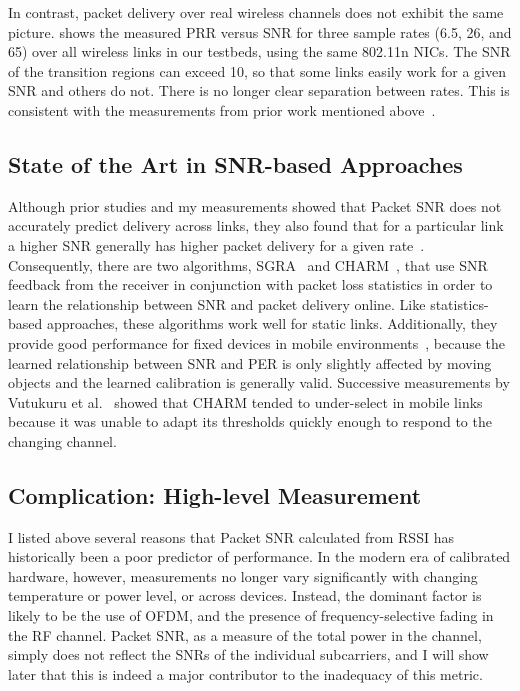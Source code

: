 In contrast, packet delivery over real wireless channels does not exhibit the same picture.  shows the measured PRR versus SNR for three sample rates (6.5\Mbps, 26\Mbps, and 65\Mbps) over all wireless links in our testbeds, using the same 802.11n NICs. The SNR of the transition regions can exceed 10\dB, so that some links easily work for a given SNR and others do not. There is no longer clear separation between rates. This is consistent with the measurements from prior work mentioned above~\cite{Aguayo_Roofnet, Judd_CHARM, Reis_interference, Zhang_SNRguided, Zhao_sensys03}.

\subsection{State of the Art in SNR-based Approaches}
Although prior studies and my measurements showed that Packet SNR does not accurately predict delivery across links, they also found that for a particular link a higher SNR generally has higher packet delivery for a given rate~\cite{Aguayo_Roofnet,Judd_CHARM,Zhang_SNRguided}. Consequently, there are two algorithms, SGRA~\cite{Zhang_SNRguided} and CHARM~\cite{Judd_CHARM}, that use SNR feedback from the receiver in conjunction with packet loss statistics in order to learn the relationship between SNR and packet delivery online. Like statistics-based approaches, these algorithms work well for static links. Additionally, they provide good performance for fixed devices in mobile environments~\cite{Judd_CHARM}, because the learned relationship between SNR and PER is only slightly affected by moving objects and the learned calibration is generally valid. Successive measurements by Vutukuru et al.~\cite{Vutukuru_SoftRate} showed that CHARM tended to under-select in mobile links because it was unable to adapt its thresholds quickly enough to respond to the changing channel.

\subsection{Complication: High-level Measurement}
I listed above several reasons that Packet SNR calculated from RSSI has historically been a poor predictor of performance. In the modern era of calibrated hardware, however, measurements no longer vary significantly with changing temperature or power level, or across devices. Instead, the dominant factor is likely to be the use of OFDM, and the presence of frequency-selective fading in the RF channel. Packet SNR, as a measure of the total power in the channel, simply does not reflect the SNRs of the individual subcarriers, and I will show later that this is indeed a major contributor to the inadequacy of this metric.

